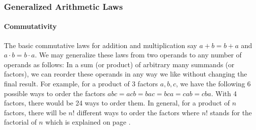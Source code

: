 

\subsubsection{Generalized Arithmetic Laws}

\paragraph{Commutativity}
The basic commutative laws for addition and multiplication say $a+b = b+a$ and $a \cdot b = b \cdot a$. We may generalize these laws from two operands to any number of operands as follows: In a sum (or product) of arbitrary many summands (or factors), we can reorder these operands in any way we like without changing the final result. For example, for a product of 3 factors $a,b,c$, we have the following 6 possible ways to order the factors $abc = acb = bac = bca = cab = cba$. With 4 factors, there would be 24 ways to order them. In general, for a product of $n$ factors, there will be $n!$ different ways to order the factors where $n!$ stands for the factorial of $n$ which is explained on page \pageref{Def:Factorial}.

